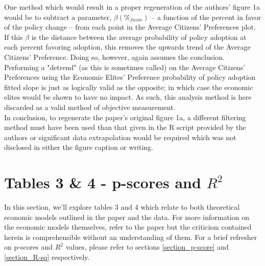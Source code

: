 \documentclass[]{article}
\begin{document}
One method which would result in a proper regeneration of the authors' figure 1a would be to subtract a parameter, $\beta(\%_{favor})$ -- a function of the percent in favor of the policy change -- from each point in the Average Citizens' Preferences plot. 
If this $\beta$ is the distance between the average probability of policy adoption at each percent favoring adoption, this removes the upwards trend of the Average Citizens' Preference.
Doing so, however, again assumes the conclusion. 
Performing a "detrend" (as this is sometimes called) on the Average Citizens' Preferences using the Economic Elites' Preference probability of policy adoption fitted slope is just as logically valid as the opposite;
in which case the economic elites would be shown to have no impact.
As such, this analysis method is here discarded as a valid method of objective measurement.\\

In conclusion, to regenerate the paper's original figure 1a, a different filtering method must have been used than that given in the R script provided by the authors or significant data extrapolation would be required which was not disclosed in either the figure caption or writing.

\section{Tables 3 \& 4 - p-scores and $R^2$}
In this section, we'll explore tables 3 and 4 which relate to both theoretical economic models outlined in the paper and the data.
For more information on the economic models themselves, refer to the paper but the criticism contained herein is comprehensible without an understanding of them.
For a brief refresher on p-scores and $R^2$ values, please refer to sections \ref{section_p-score} and \ref{section_R-sq} respectively.
\end{document}
